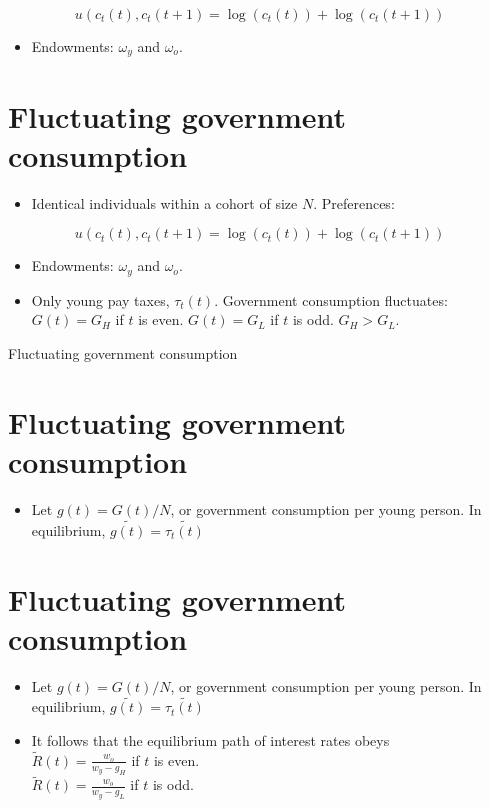 \documentclass[10pt]{article}
\begin{document}
$$
u\left(c_{t}(t), c_{t}(t+1)=\log \left(c_{t}(t)\right)+\log \left(c_{t}(t+1)\right)\right.
$$

\begin{itemize}
  \item Endowments: $\omega_{y}$ and $\omega_{o}$.
\end{itemize}

\section*{Fluctuating government consumption}
\begin{itemize}
  \item Identical individuals within a cohort of size $N$. Preferences:
\end{itemize}

$$
u\left(c_{t}(t), c_{t}(t+1)=\log \left(c_{t}(t)\right)+\log \left(c_{t}(t+1)\right)\right.
$$

\begin{itemize}
  \item Endowments: $\omega_{y}$ and $\omega_{o}$.
  \item Only young pay taxes, $\tau_{t}(t)$. Government consumption fluctuates: $G(t)=G_{H}$ if $t$ is even. $G(t)=G_{L}$ if $t$ is odd. $G_{H}>G_{L}$.
\end{itemize}

Fluctuating government consumption

\section*{Fluctuating government consumption}
\begin{itemize}
  \item Let $g(t)=G(t) / N$, or government consumption per young person. In equilibrium, $\widetilde{g(t)}=\widetilde{\tau_{t}(t)}$
\end{itemize}

\section*{Fluctuating government consumption}
\begin{itemize}
  \item Let $g(t)=G(t) / N$, or government consumption per young person. In equilibrium, $\widetilde{g(t)}=\widetilde{\tau_{t}(t)}$
  \item It follows that the equilibrium path of interest rates obeys\\
$\widetilde{R}(t)=\frac{w_{o}}{w_{y}-g_{H}}$ if $t$ is even.\\
$\widetilde{R}(t)=\frac{w_{o}}{w_{y}-g_{L}}$ if $t$ is odd.
\end{itemize}
\end{document}
